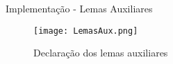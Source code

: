 \begin{frame}{Implementação - Lemas Auxiliares}
    \begin{figure}[htbp]
        \centering
        \texttt{[image: LemasAux.png]}
        \caption{Declaração dos lemas auxiliares}
    \end{figure}
\end{frame}
